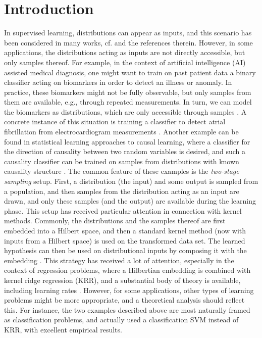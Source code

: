 \documentclass[letterpaper]{article} %
\begin{document}
\section{Introduction} \label{sec:distrslt:intro}
In supervised learning, distributions can appear as inputs, and this scenario has been considered in many works, cf. \cite{muandet2012learning} and the references therein.
However, in some applications, the distributions acting as inputs are not directly accessible, but only samples thereof.
For example, in the context of artificial intelligence (AI) assisted medical diagnosis, one might want to train on past patient data a binary classifier acting on biomarkers in order to detect an illness or anomaly.
In practice, these biomarkers might not be fully observable, but only samples from them are available, e.g., through repeated measurements.
In turn, we can model the biomarkers as distributions, which are only accessible through samples \cite{szabo2015two}.
A concrete instance of this situation is training a classifier to detect atrial fibrillation from electrocardiogram measurements \cite{massiani2025robust}.
Another example can be found in statistical learning approaches to causal learning, where a classifier for the direction of causality between two random variables is desired, and such a causality classifier can be trained on samples from distributions with known causality structure \cite{lopezpaz2015towards}.
The common feature of these examples is the \emph{two-stage sampling} setup.
First, a distribution (the input) and some output is sampled from a population, and then samples from the distribution acting as an input are drawn, and only these samples (and the output) are available during the learning phase.
This setup has received particular attention in connection with kernel methods.
Commonly, the distributions and the samples thereof are first embedded into a Hilbert space,
and then a standard kernel method (now with inputs from a Hilbert space) is used on the transformed data set.
The learned hypothesis can then be used on distributional inputs by composing it with the embedding \cite{szabo2015two}.
This strategy has received a lot of attention, especially in the context of regression problems, where a Hilbertian embedding is combined with kernel ridge regression (KRR), and a substantial body of theory is available, including learning rates \cite{szabo2015two,szabo2016learning}.
However, for some applications, other types of learning problems might be more appropriate, and a theoretical analysis should reflect this.
For instance, the two examples described above are most naturally framed as classification problems, and \cite{massiani2025robust} actually used a classification SVM instead of KRR, with excellent empirical results.
\end{document}
